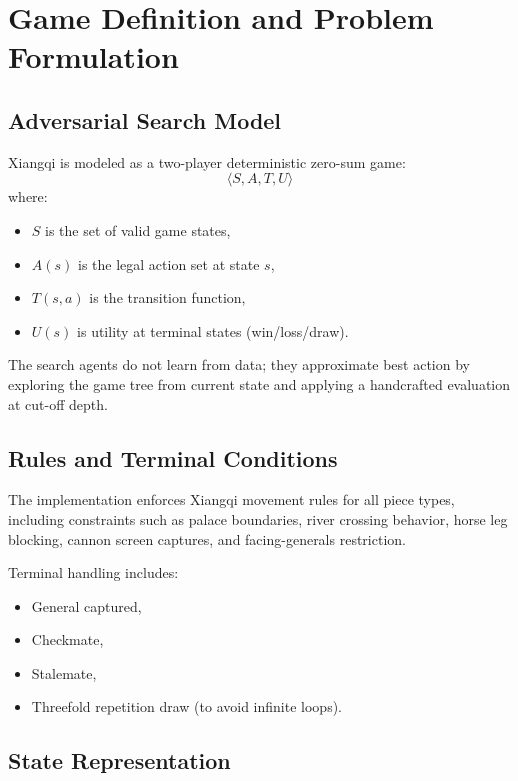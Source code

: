 \documentclass[a4paper,12pt]{article}
\begin{document}

\section{Game Definition and Problem Formulation}

\subsection{Adversarial Search Model}

Xiangqi is modeled as a two-player deterministic zero-sum game:
\[
\langle S, A, T, U \rangle
\]
where:
\begin{itemize}
  \item $S$ is the set of valid game states,
  \item $A(s)$ is the legal action set at state $s$,
  \item $T(s,a)$ is the transition function,
  \item $U(s)$ is utility at terminal states (win/loss/draw).
\end{itemize}

The search agents do not learn from data; they approximate best action by exploring the game tree from current state and applying a handcrafted evaluation at cut-off depth.

\subsection{Rules and Terminal Conditions}

The implementation enforces Xiangqi movement rules for all piece types, including constraints such as palace boundaries, river crossing behavior, horse leg blocking, cannon screen captures, and facing-generals restriction.

Terminal handling includes:
\begin{itemize}
    \item General captured,
    \item Checkmate,
    \item Stalemate,
    \item Threefold repetition draw (to avoid infinite loops).
\end{itemize}

\subsection{State Representation}
\end{document}
